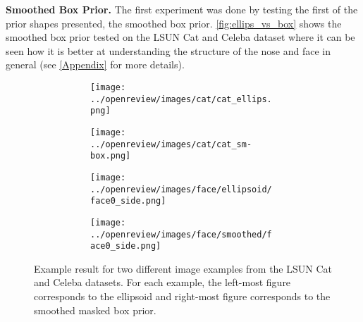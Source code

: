 \textbf{Smoothed Box Prior.}
The first experiment was done by testing the first of the prior shapes presented, the smoothed box prior. \autoref{fig:ellips_vs_box} shows the smoothed box prior tested on the LSUN Cat and Celeba dataset where it can be seen how it is better at understanding the structure of the nose and face in general (see \autoref{Appendix} for more details). \begin{figure}[!htb]
    \centering
    \begin{subfigure}{0.40\textwidth}
        \begin{subfigure}{0.48\textwidth}
            \centering
            \texttt{[image: ../openreview/images/cat/cat\_ellips.png]}
        \end{subfigure}
        \begin{subfigure}{0.48\textwidth}
            \centering
            \texttt{[image: ../openreview/images/cat/cat\_sm-box.png]}
        \end{subfigure}
    \end{subfigure}
    \begin{subfigure}{0.40\textwidth}
        \begin{subfigure}{0.48\textwidth}
            \centering
            \texttt{[image: ../openreview/images/face/ellipsoid/face0\_side.png]}
        \end{subfigure}
        \begin{subfigure}{0.48\textwidth}
            \centering
            \texttt{[image: ../openreview/images/face/smoothed/face0\_side.png]}
        \end{subfigure}
    \end{subfigure}
    \caption{Example result for two different image examples from the LSUN Cat and Celeba datasets. For each example, the left-most figure corresponds to the ellipsoid and right-most figure corresponds to the smoothed masked box prior.}
    \label{fig:ellips_vs_box}
\end{figure}

